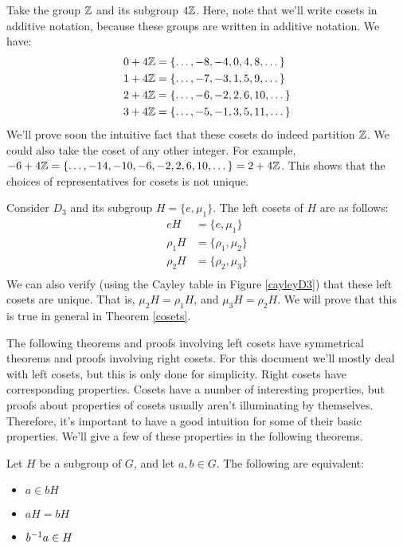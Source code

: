 \begin{example}
Take the group $\mathbb{Z}$ and its subgroup $4\mathbb{Z}$. Here, note that we'll write cosets in additive notation, because these groups are written in additive notation. We have:
\begin{align*}
    0 + 4\mathbb{Z} &= \{\dots, -8, -4, 0, 4, 8, \dots\} \\
    1 + 4\mathbb{Z} &= \{\dots, -7, -3, 1, 5, 9, \dots\} \\
    2 + 4\mathbb{Z} &= \{\dots, -6, -2, 2, 6, 10, \dots\} \\
    3 + 4\mathbb{Z} &= \{\dots, -5, -1, 3, 5, 11, \dots\}
\end{align*}
We'll prove soon the intuitive fact that these cosets do indeed partition $\mathbb{Z}$. We could also take the coset of any other integer. For example, $-6 + 4\mathbb{Z} = \{\dots, -14, -10, -6, -2, 2, 6, 10, \dots\} = 2 + 4\mathbb{Z}$. This shows that the choices of representatives for cosets is not unique.
\end{example}

\begin{example}
Consider $D_3$ and its subgroup $H = \{e, \mu_1\}$. The left cosets of $H$ are as follows:
\begin{align*}
    eH      &= \{e, \mu_1\}      \\
    \rho_1H &= \{\rho_1, \mu_2\} \\
    \rho_2H &= \{\rho_2, \mu_3\} \\
\end{align*}
We can also verify (using the Cayley table in Figure \ref{cayleyD3}) that these left cosets are unique. That is, $\mu_2H = \rho_1H$, and $\mu_3H = \rho_2H$. We will prove that this is true in general in Theorem \ref{cosets}.
\end{example}

The following theorems and proofs involving left cosets have symmetrical theorems and proofs involving right cosets. For this document we'll mostly deal with left cosets, but this is only done for simplicity. Right cosets have corresponding properties. Cosets have a number of interesting properties, but proofs about properties of cosets usually aren't illuminating by themselves. Therefore, it's important to have a good intuition for some of their basic properties. We'll give a few of these properties in the following theorems.

\begin{theorem}
\label{cosets}
Let $H$ be a subgroup of $G$, and let $a, b \in G$. The following are equivalent:
\begin{itemize}
\item $a \in bH$
\item $aH = bH$
\item $b^{-1}a \in H$
\end{itemize}
\end{theorem}

